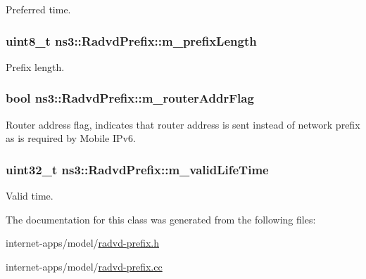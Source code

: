 Preferred time. 

\subsubsection[{\texorpdfstring{m\+\_\+prefix\+Length}{m_prefixLength}}]{\setlength{\rightskip}{0pt plus 5cm}uint8\+\_\+t ns3\+::\+Radvd\+Prefix\+::m\+\_\+prefix\+Length\hspace{0.3cm}{\ttfamily [private]}}\hypertarget{classns3_1_1RadvdPrefix_a664e8acbea39d87b88273062d060540c}{}\label{classns3_1_1RadvdPrefix_a664e8acbea39d87b88273062d060540c}


Prefix length. 

\subsubsection[{\texorpdfstring{m\+\_\+router\+Addr\+Flag}{m_routerAddrFlag}}]{\setlength{\rightskip}{0pt plus 5cm}bool ns3\+::\+Radvd\+Prefix\+::m\+\_\+router\+Addr\+Flag\hspace{0.3cm}{\ttfamily [private]}}\hypertarget{classns3_1_1RadvdPrefix_a14fddd31f06239439a29e6efa1b80d8a}{}\label{classns3_1_1RadvdPrefix_a14fddd31f06239439a29e6efa1b80d8a}


Router address flag, indicates that router address is sent instead of network prefix as is required by Mobile I\+Pv6. 

\subsubsection[{\texorpdfstring{m\+\_\+valid\+Life\+Time}{m_validLifeTime}}]{\setlength{\rightskip}{0pt plus 5cm}uint32\+\_\+t ns3\+::\+Radvd\+Prefix\+::m\+\_\+valid\+Life\+Time\hspace{0.3cm}{\ttfamily [private]}}\hypertarget{classns3_1_1RadvdPrefix_a9a6f2b50e4f17ad992eee2fdf1540e98}{}\label{classns3_1_1RadvdPrefix_a9a6f2b50e4f17ad992eee2fdf1540e98}


Valid time. 



The documentation for this class was generated from the following files\+:\begin{DoxyCompactItemize}
\item 
internet-\/apps/model/\hyperlink{radvd-prefix_8h}{radvd-\/prefix.\+h}\item 
internet-\/apps/model/\hyperlink{radvd-prefix_8cc}{radvd-\/prefix.\+cc}\end{DoxyCompactItemize}
